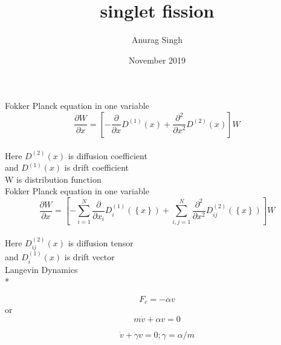 \documentclass{article}
\title{singlet fission}
\author{Anurag Singh }
\date{November 2019}
\begin{document}
Fokker Planck equation in one variable\\
{\Large\[
    \frac{
        \partial W
    }{
        \partial x
    } = \left [ 
        - \frac{
            \partial 
        }{
            \partial x
        }D^{
            \left ( 
                1 
            \right )
        }\left (
            x 
        \right ) + \frac{
            \partial^{2}
        }{
            \partial x^{2}
        }D^{
            \left (2 \right )
        } \left ( x \right ) 
    \right ] W
    \]
}\\
Here \( D^{\left (2 \right )} \left ( x \right ) \) is diffusion coefficient\\
and \( D^{\left (1 \right )} \left ( x \right ) \) is drift coefficient\\
W is distribution function\\
Fokker Planck equation in one variable\\
{\Large\[
    \frac{
        \partial W
    }{
        \partial x
    } = \left [
        - \sum_{i=1}^{N}
        \frac{
            \partial 
        }{
            \partial x_{i}
        }D_{i}^{
            \left ( 
                1 
            \right )
        }\left (
            \left \{
                x
            \right \} 
        \right ) 
        + \sum_{i,j= 1}^{N}
        \frac{
            \partial^{2}
        }{
            \partial x^{2}
        }D_{ij}^{
            \left (2 \right )
        } \left ( 
            \left \{
                x 
            \right \}
        \right ) 
    \right ] W
    \]
}\\
Here \( D_{ij}^{\left (2 \right )} \left ( x \right ) \) is diffusion tensor\\
and \( D_{i}^{\left (1 \right )} \left ( x \right ) \) is drift vector\\

Langevin Dynamics\\*

\Large \[
    F_{c} = - \alpha v
\]
or
\Large \[
    m \dot{v} + \alpha v = 0
\]

\Large \[
     \dot{v} + \gamma v = 0 ; \gamma = \alpha / m
\]




\begin{tabular}{c c c c}
\end{tabular}



\end{document}
